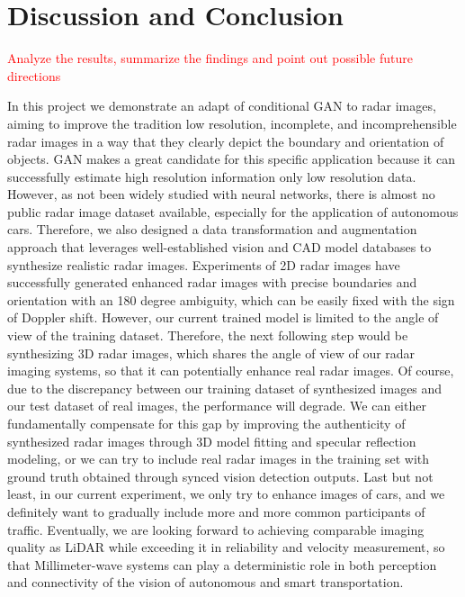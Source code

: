 \section{Discussion and Conclusion} \label{conclusion}
\textcolor{red}{
Analyze the results, summarize the findings and point out possible future directions}

In this project we demonstrate an adapt of conditional GAN to radar images, aiming to improve the tradition low resolution, incomplete, and incomprehensible radar images in a way that they clearly depict the boundary and orientation of objects. GAN makes a great candidate for this specific application because it can successfully estimate high resolution information only low resolution data. However, as not been widely studied with neural networks, there is almost no public radar image dataset available, especially for the application of autonomous cars. Therefore, we also designed a data transformation and augmentation approach that leverages well-established vision and CAD model databases to synthesize realistic radar images. Experiments of 2D radar images have successfully generated enhanced radar images with precise boundaries and orientation with an 180 degree ambiguity, which can be easily fixed with the sign of Doppler shift. However, our current trained model is limited to the angle of view of the training dataset. Therefore, the next following step would be synthesizing 3D radar images, which shares the angle of view of our radar imaging systems, so that it can potentially enhance real radar images. Of course, due to the discrepancy between our training dataset of synthesized images and our test dataset of real images, the performance will degrade. We can either fundamentally compensate for this gap by improving the authenticity of synthesized radar images through 3D model fitting and specular reflection modeling, or we can try to include real radar images in the training set with ground truth obtained through synced vision detection outputs. Last but not least, in our current experiment, we only try to enhance images of cars, and we definitely want to gradually include more and more common participants of traffic. Eventually, we are looking forward to achieving comparable imaging quality as LiDAR while exceeding it in reliability and velocity measurement, so that Millimeter-wave systems can play a deterministic role in both perception and connectivity of the vision of autonomous and smart transportation.        

